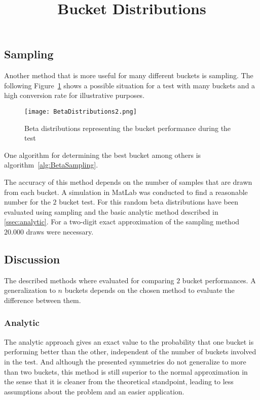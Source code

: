 \documentclass[../Thesis.tex]{subfiles}
\begin{document}
\subsection{Sampling}
Another method that is more useful for many different buckets is sampling. The following Figure~\ref{fig:SampleBucks} shows a possible situation for a test with many buckets and a high conversion rate for illustrative purposes.
\begin{figure}[h]
\centering
\texttt{[image: BetaDistributions2.png]}
\title{Bucket Distributions}
\caption[Bucket Distributions]{Beta distributions representing the bucket performance during the test}
\label{fig:SampleBucks}
\end{figure}
One algorithm for determining the best bucket among others is algorithm~\ref{alg:BetaSampling}.
The accuracy of this method depends on the number of samples that are drawn from each bucket. A simulation in MatLab was conducted to find a reasonable number for the $2$ bucket test. For this random beta distributions have been evaluated using sampling and the basic analytic method described in \ref{ssec:analytic}. For a two-digit exact approximation of the sampling method $20.000$ draws were necessary.


\subsection{Discussion}
The described methods where evaluated for comparing $2$ bucket performances. A generalization to $n$ buckets depends on the chosen method to evaluate the difference between them.

\subsubsection{Analytic}
The analytic approach gives an exact value to the probability that one bucket is performing better than the other, independent of the number of buckets involved in the test. And although the presented symmetries do not generalize to more than two buckets, this method is still superior to the normal approximation in the sense that it is cleaner from the theoretical standpoint, leading to less assumptions about the problem and an easier application.
\end{document}
